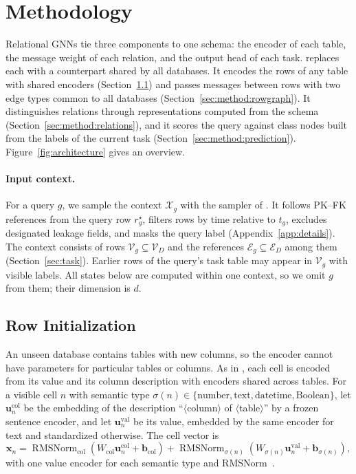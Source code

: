\section{Methodology}
\label{sec:method}

Relational GNNs tie three components to one schema: the encoder of each
table, the message weight of each relation, and the output head of each task.
\model{} replaces each with a counterpart shared by all databases. It encodes
the rows of any table with shared encoders
(Section~\ref{sec:method:initialization}) and passes messages between rows
with two edge types common to all databases
(Section~\ref{sec:method:rowgraph}). It distinguishes relations through
representations computed from the schema
(Section~\ref{sec:method:relations}), and it scores the query against class
nodes built from the labels of the current task
(Section~\ref{sec:method:prediction}). Figure~\ref{fig:architecture} gives an
overview.

\paragraph{Input context.}
\label{sec:method:sampling}
For a query $g$, we sample the context $\mathcal X_g$ with the sampler of
\RT{} \citep[Section~3.1]{ranjan2026rt}. It follows PK--FK references from the
query row $r_g^\star$, filters rows by time relative to $t_g$, excludes
designated leakage fields, and masks the query label
(Appendix~\ref{app:details}). The context consists of rows
$\mathcal V_g\subseteq\mathcal V_D$ and the references
$\mathcal E_g\subseteq\mathcal E_D$ among them (Section~\ref{sec:task}).
Earlier rows of the query's task table may
appear in $\mathcal V_g$ with visible labels. All states below are computed
within one context, so we omit $g$ from them; their dimension is $d$.

\subsection{Row Initialization}
\label{sec:method:initialization}

An unseen database contains tables with new columns, so the encoder cannot
have parameters for particular tables or columns. As in \RT{}, each cell is
encoded from its value and its column description with encoders shared
across tables. For a visible cell $n$ with semantic type
$\sigma(n)\in\{\text{number},\text{text},\text{datetime},\text{Boolean}\}$,
let $\mathbf u_n^{\mathrm{col}}$ be the embedding of the description
``$\langle$column$\rangle$ of $\langle$table$\rangle$'' by a frozen sentence
encoder, and let $\mathbf u_n^{\mathrm{val}}$ be its value, embedded by the
same encoder for text and standardized otherwise. The cell vector is
\begin{equation}
 \mathbf x_n=
 \operatorname{RMSNorm}_{\mathrm{col}}\!\left(W_{\mathrm{col}}\mathbf u_n^{\mathrm{col}}+\mathbf b_{\mathrm{col}}\right)
 +\operatorname{RMSNorm}_{\sigma(n)}\!\left(W_{\sigma(n)}\mathbf u_n^{\mathrm{val}}+\mathbf b_{\sigma(n)}\right),
 \label{eq:cell}
\end{equation}
with one value encoder for each semantic type and
RMSNorm~\citep{zhang2019rmsnorm}.

